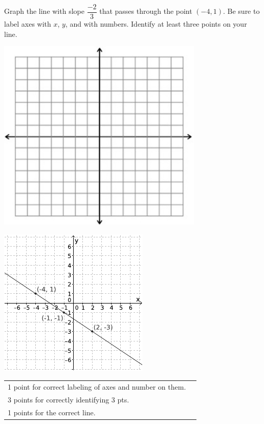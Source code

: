 {
      Graph the line with slope $\dfrac{-2}{3}$ that passes through the point $(-4, 1)$. Be sure to label axes with $x$, $y$, and with numbers. Identify at least three points on your line.\begin{onlyproblem}\begin{center}\includegraphics{fig-graphpaper.png}\end{center}\end{onlyproblem} \begin{onlysolution}\begin{center}\includegraphics{fig095-08-a-answer}\end{center}\end{onlysolution}
}
{
	\begin{tabular}{l r}
	1 point for correct labeling of axes and number on them.\\
	3 points for correctly identifying 3 pts.\\
	1 points for the correct line.\\
	\end{tabular}
}

